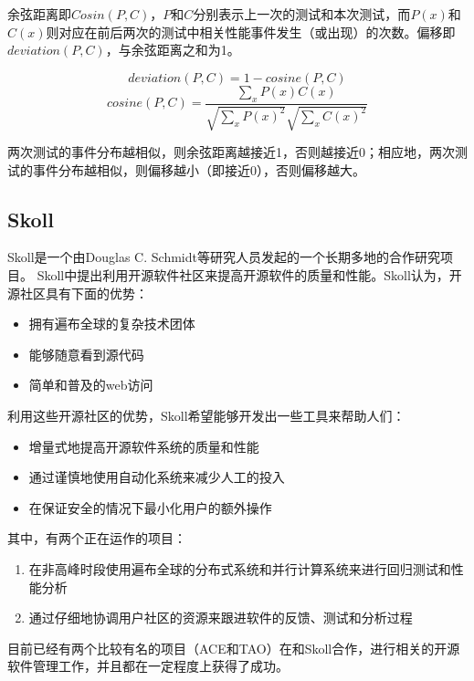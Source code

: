 余弦距离即$Cosin(P, C)$，$P$和$C$分别表示上一次的测试和本次测试，而$P(x)$和$C(x)$则对应在前后两次的测试中相关性能事件发生（或出现）的次数。偏移即$deviation(P, C)$，与余弦距离之和为1。

\begin{equation}
\label{equ:dev-cos} deviation(P, C) = 1 - cosine(P, C)
\end{equation}
\begin{equation}
\label{equ:dist-cos} cosine(P, C) = \frac{\sum_x P(x)C(x)}{\sqrt{\sum_xP(x)^2}\sqrt{\sum_xC(x)^2}}
\end{equation}

两次测试的事件分布越相似，则余弦距离越接近1，否则越接近0；相应地，两次测试的事件分布越相似，则偏移越小（即接近0），否则偏移越大。

\subsection{Skoll}

Skoll是一个由Douglas C. Schmidt等研究人员发起的一个长期多地的合作研究项目。
Skoll中提出利用开源软件社区来提高开源软件的质量和性能。Skoll认为，开源社区具有下面的优势：

\begin{itemize}
\item 拥有遍布全球的复杂技术团体
\item 能够随意看到源代码
\item 简单和普及的web访问
\end{itemize}

利用这些开源社区的优势，Skoll希望能够开发出一些工具来帮助人们：

\begin{itemize}
\item 增量式地提高开源软件系统的质量和性能
\item 通过谨慎地使用自动化系统来减少人工的投入
\item 在保证安全的情况下最小化用户的额外操作
\end{itemize}
其中，有两个正在运作的项目：
\begin{enumerate}
\item 在非高峰时段使用遍布全球的分布式系统和并行计算系统来进行回归测试和性能分析
\item 通过仔细地协调用户社区的资源来跟进软件的反馈、测试和分析过程 
\end{enumerate}

目前已经有两个比较有名的项目（ACE和TAO）在和Skoll合作，进行相关的开源软件管理工作，并且都在一定程度上获得了成功。

